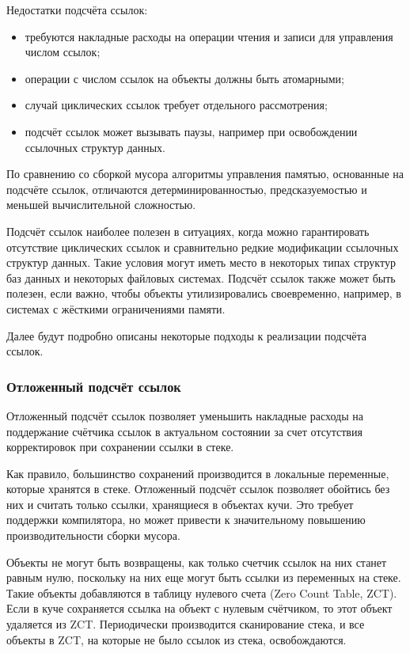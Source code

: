 Недостатки подсчёта ссылок:

\begin{itemize}[label*=---]
	\item требуются накладные расходы на операции чтения и записи для управления числом ссылок;
	\item операции с числом ссылок на объекты должны быть атомарными; \cite{handbook}
	\item случай циклических ссылок требует отдельного рассмотрения; \cite{handbook}
	\item подсчёт ссылок может вызывать паузы, например при освобождении ссылочных структур данных. \cite{handbook}
\end{itemize}

По сравнению со сборкой мусора алгоритмы управления памятью, основанные на подсчёте ссылок, отличаются детерминированностью, предсказуемостью и меньшей вычислительной сложностью. \cite{cornell2} %

Подсчёт ссылок наиболее полезен в ситуациях, когда можно гарантировать отсутствие циклических ссылок и сравнительно редкие модификации ссылочных структур данных. Такие условия могут иметь место в некоторых типах структур баз данных и некоторых файловых системах. Подсчёт ссылок также может быть полезен, если важно, чтобы объекты утилизировались своевременно, например, в системах с жёсткими ограничениями памяти. \cite{recycling}

Далее будут подробно описаны некоторые подходы к реализации подсчёта ссылок. \cite{recycling}



\subsubsection{Отложенный подсчёт ссылок}

Отложенный подсчёт ссылок позволяет уменьшить накладные расходы на поддержание счётчика ссылок в актуальном состоянии за счет отсутствия корректировок при сохранении ссылки в стеке. \cite{glossary}

Как правило, большинство сохранений производится в локальные переменные, которые хранятся в стеке. Отложенный подсчёт ссылок позволяет обойтись без них и считать только ссылки, хранящиеся в объектах кучи. Это требует поддержки компилятора, но может привести к значительному повышению производительности сборки мусора. \cite{glossary}

Объекты не могут быть возвращены, как только счетчик ссылок на них станет равным нулю, поскольку на них еще могут быть ссылки из переменных на стеке. Такие объекты добавляются в таблицу нулевого счета (Zero Count Table, ZCT). Если в куче сохраняется ссылка на объект с нулевым счётчиком, то этот объект удаляется из ZCT. Периодически производится сканирование стека, и все объекты в ZCT, на которые не было ссылок из стека, освобождаются. \cite{glossary}

